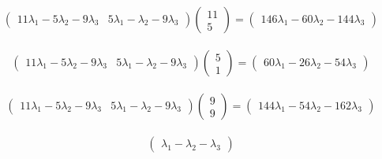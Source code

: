 \documentclass[12pt]{report}
\begin{document}
\begin{equation}
	\begin{aligned}
		\begin{pmatrix}11\lambda_{1}-5\lambda_{2}-9\lambda_{3} & 5\lambda_{1}-\lambda_{2}-9\lambda_{3}\end{pmatrix}\begin{pmatrix}11 \\ 5\end{pmatrix}=\begin{pmatrix}146\lambda_{1}-60\lambda_{2}-144\lambda_{3}\end{pmatrix}
	\end{aligned}
\end{equation}

\begin{equation}
	\begin{aligned}
		\begin{pmatrix}11\lambda_{1}-5\lambda_{2}-9\lambda_{3} & 5\lambda_{1}-\lambda_{2}-9\lambda_{3}\end{pmatrix}\begin{pmatrix}5 \\ 1\end{pmatrix}=\begin{pmatrix}60\lambda_{1}-26\lambda_{2}-54\lambda_{3}\end{pmatrix}
	\end{aligned}
\end{equation}

\begin{equation}
	\begin{aligned}
		\begin{pmatrix}11\lambda_{1}-5\lambda_{2}-9\lambda_{3} & 5\lambda_{1}-\lambda_{2}-9\lambda_{3}\end{pmatrix}\begin{pmatrix}9 \\ 9\end{pmatrix}=\begin{pmatrix}144\lambda_{1}-54\lambda_{2}-162\lambda_{3}\end{pmatrix}
	\end{aligned}
\end{equation}

\begin{equation}
	\begin{aligned}
		\begin{pmatrix}\lambda_{1}-\lambda_{2}-\lambda_{3}\end{pmatrix}
	\end{aligned}
\end{equation}
\end{document}
